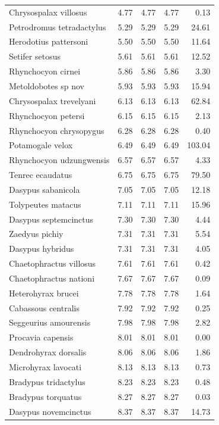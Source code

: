 \documentclass[]{elsarticle} %
\begin{document}
\begin{longtable}[t]{lrrrr}
Chrysospalax villosus & 4.77 & 4.77 & 4.77 & 0.13\\
Petrodromus tetradactylus & 5.29 & 5.29 & 5.29 & 24.61\\
\addlinespace
Herodotius pattersoni & 5.50 & 5.50 & 5.50 & 11.64\\
Setifer setosus & 5.61 & 5.61 & 5.61 & 12.52\\
Rhynchocyon cirnei & 5.86 & 5.86 & 5.86 & 3.30\\
Metoldobotes sp  nov & 5.93 & 5.93 & 5.93 & 15.94\\
Chrysospalax trevelyani & 6.13 & 6.13 & 6.13 & 62.84\\
\addlinespace
Rhynchocyon petersi & 6.15 & 6.15 & 6.15 & 2.13\\
Rhynchocyon chrysopygus & 6.28 & 6.28 & 6.28 & 0.40\\
Potamogale velox & 6.49 & 6.49 & 6.49 & 103.04\\
Rhynchocyon udzungwensis & 6.57 & 6.57 & 6.57 & 4.33\\
Tenrec ecaudatus & 6.75 & 6.75 & 6.75 & 79.50\\
\addlinespace
Dasypus sabanicola & 7.05 & 7.05 & 7.05 & 12.18\\
Tolypeutes matacus & 7.11 & 7.11 & 7.11 & 15.96\\
Dasypus septemcinctus & 7.30 & 7.30 & 7.30 & 4.44\\
Zaedyus pichiy & 7.31 & 7.31 & 7.31 & 5.54\\
Dasypus hybridus & 7.31 & 7.31 & 7.31 & 4.05\\
\addlinespace
Chaetophractus villosus & 7.61 & 7.61 & 7.61 & 0.42\\
Chaetophractus nationi & 7.67 & 7.67 & 7.67 & 0.09\\
Heterohyrax brucei & 7.78 & 7.78 & 7.78 & 1.64\\
Cabassous centralis & 7.92 & 7.92 & 7.92 & 0.25\\
Seggeurius amourensis & 7.98 & 7.98 & 7.98 & 2.82\\
\addlinespace
Procavia capensis & 8.01 & 8.01 & 8.01 & 0.00\\
Dendrohyrax dorsalis & 8.06 & 8.06 & 8.06 & 1.86\\
Microhyrax lavocati & 8.13 & 8.13 & 8.13 & 0.73\\
Bradypus tridactylus & 8.23 & 8.23 & 8.23 & 0.48\\
Bradypus torquatus & 8.27 & 8.27 & 8.27 & 0.03\\
\addlinespace
Dasypus novemcinctus & 8.37 & 8.37 & 8.37 & 14.73\\

\end{longtable}
\end{document}
